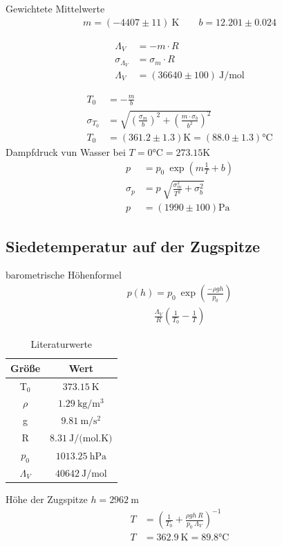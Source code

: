 \documentclass[12pt,a4paper,titlepage,headinclude,bibtotoc]{scrartcl}
\begin{document}
Gewichtete Mittelwerte
\begin{align*}
 m=(-4407 \pm 11)~\si{\kelvin} \qquad
 b=12.201 \pm 0.024
\end{align*}

\begin{align*}
 \Lambda_V &= -m\cdot R\\
 \sigma_{\Lambda_V} &= \sigma_m \cdot R\\
 \Lambda_V&=(36640 \pm 100)~\si{\joule/\mol}
\end{align*}

\begin{align*}
 T_0 &= -\frac{m}{b}\\
 \sigma_{T_0} &= \sqrt{\left(\frac{\sigma_m}{b}\right)^2+\left(\frac{m\cdot \sigma_b}{b^2}\right)^2}\\
 T_0 &= (361.2 \pm 1.3)\si{\kelvin} = (88.0 \pm 1.3)\si{\celsius}
\end{align*}
Dampfdruck vun Wasser bei $T=0\si{\celsius}=273.15\si{\kelvin}$
\begin{align*}
 p &= p_0~\exp\left(m\frac{1}{T}+b\right)\\
 \sigma_p &= p~\sqrt{\frac{\sigma_m^2}{T^2}+\sigma_b^2}\\
 p &= (1990 \pm 100)\si{\pascal}
\end{align*}


\subsection{Siedetemperatur auf der Zugspitze}
barometrische Höhenformel
\begin{align}
 p(h)=p_0~\exp{\left(\frac{-\rho g h}{p_0}\right)}
\end{align}
\begin{align*}
 \frac{\Lambda_V}{R}\left(\frac{1}{T_0}-\frac{1}{T}\right)
\end{align*}

\begin{table}[!htb]
 \centering
 \begin{tabular}{|c|c|}
  \hline
  Größe & Wert\\
  \hline
  T$_0$ & $373.15~\si{\kelvin}$\\
  $\rho$ & $1.29~\si{\kilo \gram/\meter^3}$\\
  g & $9.81~\si{\meter/\second^2}$\\
  R & $8.31~\si{\joule/(\mol.\kelvin)}$\\
  $p_0$ & $1013.25~\si{\hecto \pascal}$\\
  $\Lambda_V$ & $40642 ~\si{\joule/\mol}$\\
  \hline
 \end{tabular}
 \caption{Literaturwerte}
 \label{tab:litW}
\end{table}
Höhe der Zugspitze $h=2962~\si{\meter}$
\begin{align*}
 T &= \left(\frac{1}{T_0}+\frac{\rho g h~R}{p_0~\Lambda_V}\right)^{-1}\\
 T&=362.9~\si{\kelvin}=89.8\si{\celsius}
\end{align*}
\end{document}
